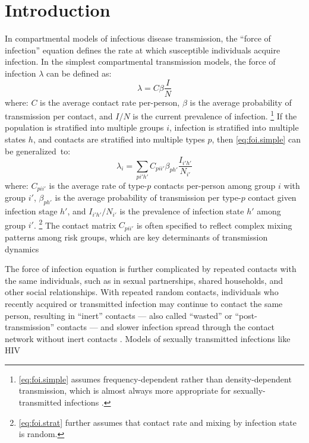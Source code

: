 \section{Introduction}\label{intro}
In compartmental models of infectious disease transmission,
the ``force of infection'' equation defines
the rate at which susceptible individuals acquire infection.
In the simplest compartmental transmission models,
the force of infection $\lambda$ can be defined as:
\begin{equation}\label{eq:foi.simple}
  \lambda = C \beta \frac{I}{N}
\end{equation} where:
$C$ is the average contact rate per-person,
$\beta$ is the average probability of transmission per contact, and
$I/N$ is the current prevalence of infection.%
\footnote{\eqref{eq:foi.simple} assumes
  frequency-dependent rather than density-dependent transmission,
  which is almost always more appropriate for sexually-transmitted infections \cite{Begon2002}.}
If the population is stratified into multiple groups $i$,
infection is stratified into multiple states $h$, and
contacts are stratified into multiple types $p$,
then \eqref{eq:foi.simple} can be generalized~to:
\begin{equation}\label{eq:foi.strat}
  \lambda_i = \sum_{pi'h'} C_{pii'} \beta_{ph'} \frac{I_{i'h'}}{N_{i'}}
\end{equation}
where:
$C_{pii'}$ is the average rate of type-$p$ contacts per-person among group $i$ with group $i'$,
$\beta_{ph'}$ is the average probability of transmission per type-$p$ contact given infection stage $h'$, and
$I_{i'h'}/N_{i'}$ is the prevalence of infection state $h'$ among group $i'$.%
\footnote{\eqref{eq:foi.strat} further assumes that
  contact rate and mixing by infection state is random.}
The contact matrix $C_{pii'}$ is often specified to reflect
complex mixing patterns among risk groups,
which are key determinants of transmission dynamics \cite{Bansal2010,Rao2021}
\par
The force of infection equation is further complicated by
repeated contacts with the same individuals, such as
in sexual partnerships, shared households, and other social relationships.
With repeated \vs random contacts, individuals who recently acquired or transmitted infection
may continue to contact the same person, resulting in ``inert'' contacts
--- also called ``wasted'' or ``post-transmission'' contacts ---
and slower infection spread through the contact network \vs without inert contacts \cite{Smieszek2009}.
Models of sexually transmitted infections like HIV
